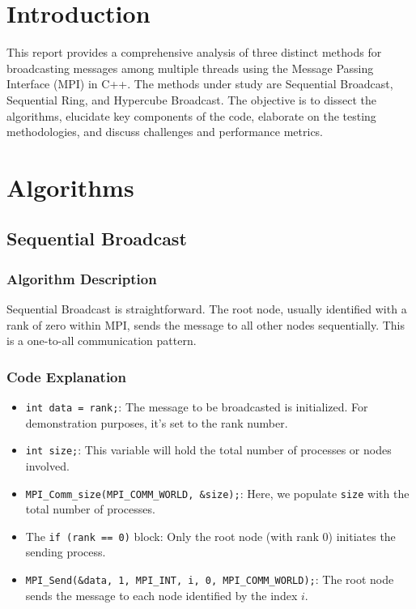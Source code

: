 \documentclass[11pt]{article}
\begin{document}
\maketitle
\thispagestyle{empty}
\newpage

\tableofcontents
\newpage

\section{Introduction}
This report provides a comprehensive analysis of three distinct methods for broadcasting messages among multiple threads using the Message Passing Interface (MPI) in C++. The methods under study are Sequential Broadcast, Sequential Ring, and Hypercube Broadcast. The objective is to dissect the algorithms, elucidate key components of the code, elaborate on the testing methodologies, and discuss challenges and performance metrics.

\section{Algorithms}

\subsection{Sequential Broadcast}

\subsubsection{Algorithm Description}
Sequential Broadcast is straightforward. The root node, usually identified with a rank of zero within MPI, sends the message to all other nodes sequentially. This is a one-to-all communication pattern.

\subsubsection{Code Explanation}
\begin{itemize}
    \item \texttt{int data = rank;}: The message to be broadcasted is initialized. For demonstration purposes, it's set to the rank number.
    \item \texttt{int size;}: This variable will hold the total number of processes or nodes involved.
    \item \texttt{MPI\_Comm\_size(MPI\_COMM\_WORLD, \&size);}: Here, we populate \texttt{size} with the total number of processes.
    \item The \texttt{if (rank == 0)} block: Only the root node (with rank 0) initiates the sending process.
    \item \texttt{MPI\_Send(\&data, 1, MPI\_INT, i, 0, MPI\_COMM\_WORLD);}: The root node sends the message to each node identified by the index \(i\).
\end{itemize}
\end{document}
